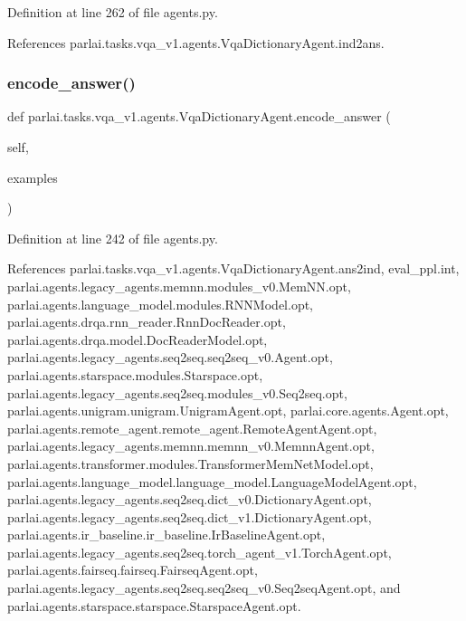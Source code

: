 Definition at line 262 of file agents.\+py.



References parlai.\+tasks.\+vqa\+\_\+v1.\+agents.\+Vqa\+Dictionary\+Agent.\+ind2ans.

\mbox{\label{classparlai_1_1tasks_1_1vqa__v1_1_1agents_1_1VqaDictionaryAgent_a6e40e864eceef9b413db16c9ebb9b22b}} 
\subsubsection{\texorpdfstring{encode\+\_\+answer()}{encode\_answer()}}
{\footnotesize\ttfamily def parlai.\+tasks.\+vqa\+\_\+v1.\+agents.\+Vqa\+Dictionary\+Agent.\+encode\+\_\+answer (\begin{DoxyParamCaption}\item[{}]{self,  }\item[{}]{examples }\end{DoxyParamCaption})}



Definition at line 242 of file agents.\+py.



References parlai.\+tasks.\+vqa\+\_\+v1.\+agents.\+Vqa\+Dictionary\+Agent.\+ans2ind, eval\+\_\+ppl.\+int, parlai.\+agents.\+legacy\+\_\+agents.\+memnn.\+modules\+\_\+v0.\+Mem\+N\+N.\+opt, parlai.\+agents.\+language\+\_\+model.\+modules.\+R\+N\+N\+Model.\+opt, parlai.\+agents.\+drqa.\+rnn\+\_\+reader.\+Rnn\+Doc\+Reader.\+opt, parlai.\+agents.\+drqa.\+model.\+Doc\+Reader\+Model.\+opt, parlai.\+agents.\+legacy\+\_\+agents.\+seq2seq.\+seq2seq\+\_\+v0.\+Agent.\+opt, parlai.\+agents.\+starspace.\+modules.\+Starspace.\+opt, parlai.\+agents.\+legacy\+\_\+agents.\+seq2seq.\+modules\+\_\+v0.\+Seq2seq.\+opt, parlai.\+agents.\+unigram.\+unigram.\+Unigram\+Agent.\+opt, parlai.\+core.\+agents.\+Agent.\+opt, parlai.\+agents.\+remote\+\_\+agent.\+remote\+\_\+agent.\+Remote\+Agent\+Agent.\+opt, parlai.\+agents.\+legacy\+\_\+agents.\+memnn.\+memnn\+\_\+v0.\+Memnn\+Agent.\+opt, parlai.\+agents.\+transformer.\+modules.\+Transformer\+Mem\+Net\+Model.\+opt, parlai.\+agents.\+language\+\_\+model.\+language\+\_\+model.\+Language\+Model\+Agent.\+opt, parlai.\+agents.\+legacy\+\_\+agents.\+seq2seq.\+dict\+\_\+v0.\+Dictionary\+Agent.\+opt, parlai.\+agents.\+legacy\+\_\+agents.\+seq2seq.\+dict\+\_\+v1.\+Dictionary\+Agent.\+opt, parlai.\+agents.\+ir\+\_\+baseline.\+ir\+\_\+baseline.\+Ir\+Baseline\+Agent.\+opt, parlai.\+agents.\+legacy\+\_\+agents.\+seq2seq.\+torch\+\_\+agent\+\_\+v1.\+Torch\+Agent.\+opt, parlai.\+agents.\+fairseq.\+fairseq.\+Fairseq\+Agent.\+opt, parlai.\+agents.\+legacy\+\_\+agents.\+seq2seq.\+seq2seq\+\_\+v0.\+Seq2seq\+Agent.\+opt, and parlai.\+agents.\+starspace.\+starspace.\+Starspace\+Agent.\+opt.

